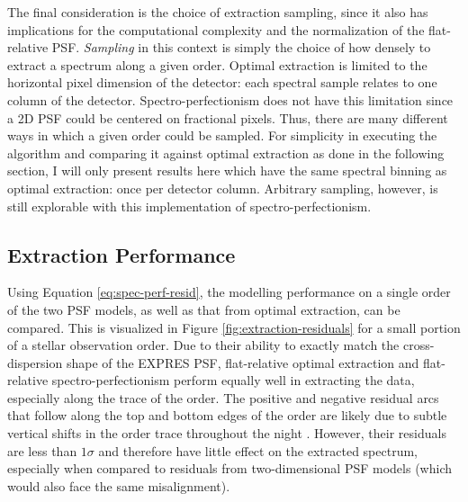 The final consideration is the choice of extraction sampling, since it also has implications for the computational complexity and the normalization of the flat-relative PSF. \textit{Sampling} in this context is simply the choice of how densely to extract a spectrum along a given order. Optimal extraction is limited to the horizontal pixel dimension of the detector: each spectral sample relates to one column of the detector. Spectro-perfectionism does not have this limitation since a 2D PSF could be centered on fractional pixels. Thus, there are many different ways in which a given order could be sampled. For simplicity in executing the algorithm and comparing it against optimal extraction as done in the following section, I will only present results here which have the same spectral binning as optimal extraction: once per detector column. Arbitrary sampling, however, is still explorable with this implementation of spectro-perfectionism.

\subsection{Extraction Performance} \label{pipeline2:spec-perf:performance}

Using Equation \ref{eq:spec-perf-resid}, the modelling performance on a single order of the two PSF models, as well as that from optimal extraction, can be compared. This is visualized in Figure \ref{fig:extraction-residuals} for a small portion of a stellar observation order. Due to their ability to exactly match the cross-dispersion shape of the EXPRES PSF, flat-relative optimal extraction and flat-relative spectro-perfectionism perform equally well in extracting the data, especially along the trace of the order. The positive and negative residual arcs that follow along the top and bottom edges of the order are likely due to subtle vertical shifts in the order trace throughout the night \citep[significantly less than one pixel per day,][]{blackman_performance_2020}. However, their residuals are less than $1\sigma$ and therefore have little effect on the extracted spectrum, especially when compared to residuals from two-dimensional PSF models (which would also face the same misalignment).

